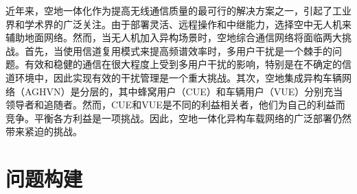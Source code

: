近年来，空地一体化作为提高无线通信质量的最可行的解决方案之一，引起了工业界和学术界的广泛关注。由于部署灵活、远程操作和中继能力，选择空中无人机来辅助地面网络\cite{ACO}。然而，当无人机加入异构场景时，空地综合通信网络将面临两大挑战。首先，当使用信道复用模式来提高频谱效率时，多用户干扰是一个棘手的问题。有效和稳健的通信在很大程度上受到多用户干扰的影响，特别是在不确定的信道环境中，因此实现有效的干扰管理是一个重大挑战\cite{CCO}。其次，空地集成异构车辆网络（AGHVN）是分层的，其中蜂窝用户（CUE）和车辆用户（VUE）分别充当领导者和追随者。然而，CUE和VUE是不同的利益相关者，他们为自己的利益而竞争。平衡各方利益是一项挑战。因此，空地一体化异构车载网络的广泛部署仍然带来紧迫的挑战。

\section{问题构建}\label{section2-2}
